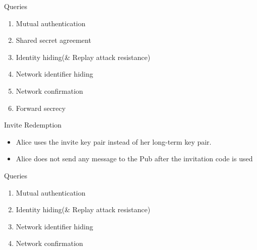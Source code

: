 \documentclass{beamer}
\begin{document}
\begin{frame}{Queries}
  \begin{enumerate}
    \item  Mutual authentication
      {\tabto{8cm}\textcolor{green!80!black}{{\large\Checkedbox}}}
    \item \alert{Shared secret agreement}
      {\tabto{8cm}\textcolor{red!80!black}{{\large\CrossedBox}}}
    \item Identity hiding(\& Replay attack resistance)
      {\tabto{8cm}\textcolor{green!80!black}{{\large\Checkedbox}}}
    \item Network identifier hiding
      {\tabto{8cm}\textcolor{red!80!black}{{\large\CrossedBox}}}
    \item Network confirmation
      {\tabto{8cm}\textcolor{green!80!black}{{\large\Checkedbox}}}
    \item \alert{Forward secrecy}
      {\tabto{8cm}\textcolor{red!80!black}{{\large\CrossedBox}}}
    \end{enumerate}
\end{frame}


\begin{frame}{Invite Redemption}
\begin{itemize}
  \item Alice uses the invite key pair instead of her long-term key pair.
  \item Alice does not send any message to the Pub after the invitation code is used
\end{itemize}
\end{frame}


\begin{frame}{Queries}
  \begin{enumerate}
    \item \alert{Mutual authentication}
      {\tabto{8cm}\textcolor{red!80!black}{{\large\CrossedBox}}}
    \item Identity hiding(\& Replay attack resistance)
      {\tabto{8cm}\textcolor{green!80!black}{{\large\Checkedbox}}}
    \item Network identifier hiding
      {\tabto{8cm}\textcolor{green!80!black}{{\large\Checkedbox}}}
    \item Network confirmation
      {\tabto{8cm}\textcolor{green!80!black}{{\large\Checkedbox}}}
    \end{enumerate}
\end{frame}
\end{document}
